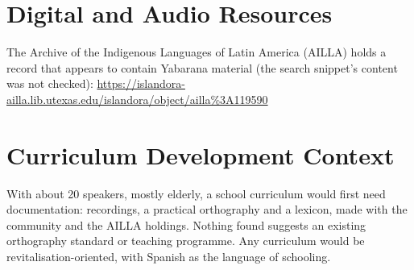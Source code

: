\documentclass[12pt]{article}
\begin{document}
\section{Digital and Audio Resources}
The Archive of the Indigenous Languages of Latin America (AILLA) holds a record that appears to contain Yabarana material (the search snippet's content was not checked): \url{https://islandora-ailla.lib.utexas.edu/islandora/object/ailla%3A119590}

\section{Curriculum Development Context}
With about 20 speakers, mostly elderly, a school curriculum would first need documentation: recordings, a practical orthography and a lexicon, made with the community and the AILLA holdings. Nothing found suggests an existing orthography standard or teaching programme. Any curriculum would be revitalisation-oriented, with Spanish as the language of schooling.
\end{document}
